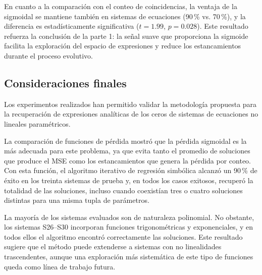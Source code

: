 \documentclass{article} \usepackage[utf8]{inputenc} \usepackage[spanish]{babel} \usepackage{amsmath, amssymb, amsthm} \usepackage{bm} \usepackage{float} \usepackage{longtable} \usepackage[hidelinks]{hyperref} \spanishdecimal{.}
\begin{document}
En cuanto a la comparación con el conteo de coincidencias, la ventaja de la sigmoidal se mantiene también en sistemas de ecuaciones (90\,\% vs. 70\,\%), y la diferencia es estadísticamente significativa (\(t = 1.99\), \(p = 0.028\)). Este resultado refuerza la conclusión de la parte 1: la señal suave que proporciona la sigmoide facilita la exploración del espacio de expresiones y reduce los estancamientos durante el proceso evolutivo.

\subsection{Consideraciones finales} \label{sec:conclusiones_capitulo}

Los experimentos realizados han permitido validar la metodología propuesta para la recuperación de expresiones analíticas de los ceros de sistemas de ecuaciones no lineales paramétricos.

La comparación de funciones de pérdida mostró que la pérdida sigmoidal es la más adecuada para este problema, ya que evita tanto el promedio de soluciones que produce el MSE como los estancamientos que genera la pérdida por conteo. Con esta función, el algoritmo iterativo de regresión simbólica alcanzó un 90\,\% de éxito en los treinta sistemas de prueba y, en todos los casos exitosos, recuperó la totalidad de las soluciones, incluso cuando coexistían tres o cuatro soluciones distintas para una misma tupla de parámetros.

La mayoría de los sistemas evaluados son de naturaleza polinomial. No obstante, los sistemas S26--S30 incorporan funciones trigonométricas y exponenciales, y en todos ellos el algoritmo encontró correctamente las soluciones. Este resultado sugiere que el método puede extenderse a sistemas con no linealidades trascendentes, aunque una exploración más sistemática de este tipo de funciones queda como línea de trabajo futura. \newpage   
\end{document}
